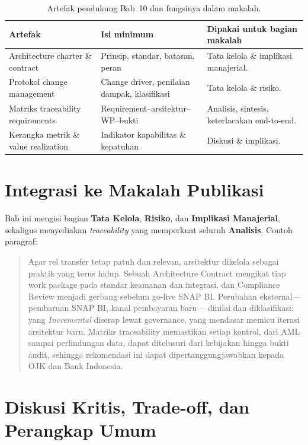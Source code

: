 \begin{table}[htbp]
\centering
\scriptsize
\caption{Artefak pendukung Bab~10 dan fungsinya dalam makalah.}
\label{tab:artefak-bab9-gov}
\begin{tabularx}{\textwidth}{@{}p{} p{} X@{}}
\hline
\textbf{Artefak} & \textbf{Isi minimum} & \textbf{Dipakai untuk bagian makalah} \\
\hline
Architecture charter \& contract & Prinsip, standar, batasan, peran & Tata kelola
\& implikasi manajerial. \\
Protokol change management & Change driver, penilaian dampak, klasifikasi & Tata
kelola \& risiko. \\
Matriks traceability requirements & Requirement--arsitektur--WP--bukti & Analisis,
sintesis, keterlacakan end-to-end. \\
Kerangka metrik \& value realization & Indikator kapabilitas \& kepatuhan & Diskusi
\& implikasi. \\
\hline
\end{tabularx}
\end{table}

\section{Integrasi ke Makalah Publikasi}

Bab ini mengisi bagian \textbf{Tata Kelola}, \textbf{Risiko}, dan \textbf{Implikasi
Manajerial}, sekaligus menyediakan \emph{traceability} yang memperkuat seluruh
\textbf{Analisis}. Contoh paragraf:

\begin{quote}
Agar rel transfer tetap patuh dan relevan, arsitektur dikelola sebagai praktik
yang terus hidup. Sebuah Architecture Contract mengikat tiap work package pada
standar keamanan dan integrasi, dan Compliance Review menjadi gerbang sebelum
go-live SNAP BI. Perubahan eksternal---pembaruan SNAP BI, kanal pembayaran baru---
dinilai dan diklasifikasi: yang \emph{Incremental} diserap lewat governance, yang
mendasar memicu iterasi arsitektur baru. Matriks traceability memastikan setiap
kontrol, dari AML sampai perlindungan data, dapat ditelusuri dari kebijakan hingga
bukti audit, sehingga rekomendasi ini dapat dipertanggungjawabkan kepada OJK dan
Bank Indonesia.
\end{quote}

\section{Diskusi Kritis, Trade-off, dan Perangkap Umum}

